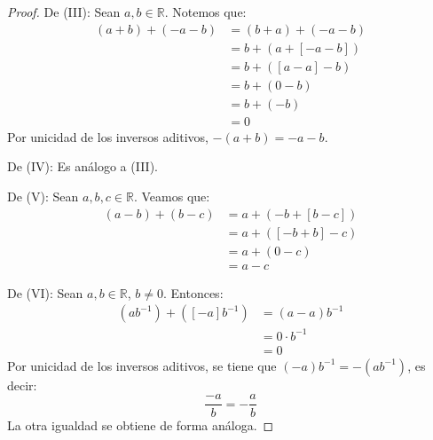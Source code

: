 \documentclass[12pt]{article}
\begin{document}
\begin{enumerate}
\begin{proof}
        De (III): Sean $a,b\in\mathbb{R}$. Notemos que:
        \begin{equation*}
            \begin{split}
                \left(a+b\right)+(-a-b)&=\left(b+a\right)+\left(-a-b\right)\\
                &=b+\left(a+\left[-a-b\right]\right)\\
                &=b+\left(\left[a-a\right]-b\right)\\
                &=b+\left(0-b\right)\\
                &=b+\left(-b\right)\\
                &=0
            \end{split}
        \end{equation*}
        Por unicidad de los inversos aditivos, $-\left(a+b\right)=-a-b$.

        De (IV): Es análogo a (III).

        De (V): Sean $a,b,c\in\mathbb{R}$. Veamos que:
        \begin{equation*}
            \begin{split}
                \left(a-b\right)+\left(b-c\right)&=a+\left(-b+\left[b-c\right]\right)\\
                &=a+\left(\left[-b+b\right]-c\right)\\
                &=a+\left(0-c\right)\\
                &=a-c
            \end{split}
        \end{equation*}

        De (VI): Sean $a,b\in\mathbb{R}$, $b\neq0$. Entonces:
        \begin{equation*}
            \begin{split}
                (ab^{-1})+([-a]b^{-1})&=\left(a-a\right)b^{-1}\\
                &=0\cdot b^{-1}\\
                &=0
            \end{split}
        \end{equation*}
        Por unicidad de los inversos aditivos, se tiene que $(-a)b^{-1}=-(ab^{-1})$, es decir:
        \begin{equation*}
            \frac{-a}{b}=-\frac{a}{b}
        \end{equation*}
        La otra igualdad se obtiene de forma análoga.


\end{proof}
\end{enumerate}
\end{document}
